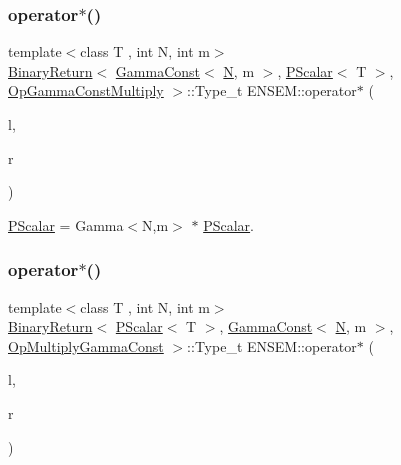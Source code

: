 \subsubsection{\texorpdfstring{operator$\ast$()}{operator*()}\hspace{0.1cm}{\footnotesize\ttfamily [2/5]}}
{\footnotesize\ttfamily template$<$class T , int N, int m$>$ \\
\mbox{\hyperlink{structENSEM_1_1BinaryReturn}{Binary\+Return}}$<$ \mbox{\hyperlink{classENSEM_1_1GammaConst}{Gamma\+Const}}$<$ \mbox{\hyperlink{operator__name__util_8cc_a7722c8ecbb62d99aee7ce68b1752f337}{N}}, m $>$, \mbox{\hyperlink{classENSEM_1_1PScalar}{P\+Scalar}}$<$ T $>$, \mbox{\hyperlink{structENSEM_1_1OpGammaConstMultiply}{Op\+Gamma\+Const\+Multiply}} $>$\+::Type\+\_\+t E\+N\+S\+E\+M\+::operator$\ast$ (\begin{DoxyParamCaption}\item[{const \mbox{\hyperlink{classENSEM_1_1GammaConst}{Gamma\+Const}}$<$ \mbox{\hyperlink{operator__name__util_8cc_a7722c8ecbb62d99aee7ce68b1752f337}{N}}, m $>$ \&}]{l,  }\item[{const \mbox{\hyperlink{classENSEM_1_1PScalar}{P\+Scalar}}$<$ T $>$ \&}]{r }\end{DoxyParamCaption})\hspace{0.3cm}{\ttfamily [inline]}}



\mbox{\hyperlink{classENSEM_1_1PScalar}{P\+Scalar}} = Gamma$<$\+N,m$>$ $\ast$ \mbox{\hyperlink{classENSEM_1_1PScalar}{P\+Scalar}}. 

\mbox{\label{group__primscalar_ga1f975f2be8a25d77d5b101c1db566a23}} 
\subsubsection{\texorpdfstring{operator$\ast$()}{operator*()}\hspace{0.1cm}{\footnotesize\ttfamily [3/5]}}
{\footnotesize\ttfamily template$<$class T , int N, int m$>$ \\
\mbox{\hyperlink{structENSEM_1_1BinaryReturn}{Binary\+Return}}$<$ \mbox{\hyperlink{classENSEM_1_1PScalar}{P\+Scalar}}$<$ T $>$, \mbox{\hyperlink{classENSEM_1_1GammaConst}{Gamma\+Const}}$<$ \mbox{\hyperlink{operator__name__util_8cc_a7722c8ecbb62d99aee7ce68b1752f337}{N}}, m $>$, \mbox{\hyperlink{structENSEM_1_1OpMultiplyGammaConst}{Op\+Multiply\+Gamma\+Const}} $>$\+::Type\+\_\+t E\+N\+S\+E\+M\+::operator$\ast$ (\begin{DoxyParamCaption}\item[{const \mbox{\hyperlink{classENSEM_1_1PScalar}{P\+Scalar}}$<$ T $>$ \&}]{l,  }\item[{const \mbox{\hyperlink{classENSEM_1_1GammaConst}{Gamma\+Const}}$<$ \mbox{\hyperlink{operator__name__util_8cc_a7722c8ecbb62d99aee7ce68b1752f337}{N}}, m $>$ \&}]{r }\end{DoxyParamCaption})\hspace{0.3cm}{\ttfamily [inline]}}



